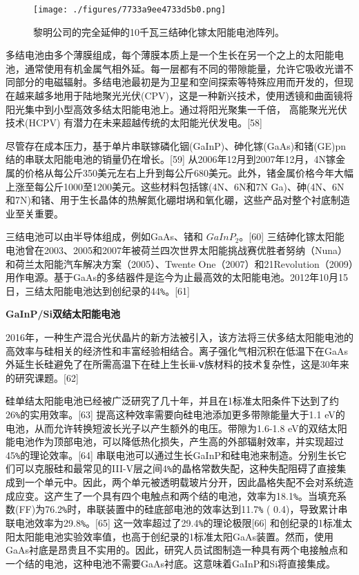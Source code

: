 \begin{figure}[ht]
\centering
\texttt{[image: ./figures/7733a9ee4733d5b0.png]}
\caption{黎明公司的完全延伸的10千瓦三结砷化镓太阳能电池阵列。} \label{fig_TYNDC_6}
\end{figure}

多结电池由多个薄膜组成，每个薄膜本质上是一个生长在另一个之上的太阳能电池，通常使用有机金属气相外延。每一层都有不同的带隙能量，允许它吸收光谱不同部分的电磁辐射。多结电池最初是为卫星和空间探索等特殊应用而开发的，但现在越来越多地用于陆地聚光光伏(CPV)，这是一种新兴技术，使用透镜和曲面镜将阳光集中到小型高效多结太阳能电池上。通过将阳光聚集一千倍， 高能聚光光伏技术(HCPV) 有潜力在未来超越传统的太阳能光伏发电。[58]

尽管存在成本压力，基于单片串联镓磷化铟(GaInP)、砷化镓(GaAs)和锗(GE)pn结的串联太阳能电池的销量仍在增长。[59] 从2006年12月到2007年12月，4N镓金属的价格从每公斤350美元左右上升到每公斤680美元。此外，锗金属价格今年大幅上涨至每公斤1000至1200美元。这些材料包括镓(4N、6N和7N Ga)、砷(4N、6N和7N)和锗、用于生长晶体的热解氮化硼坩埚和氧化硼，这些产品对整个衬底制造业至关重要。

三结电池可以由半导体组成，例如GaAs、锗和 $GaInP_2$。[60] 三结砷化镓太阳能电池曾在2003、2005和2007年被荷兰四次世界太阳能挑战赛优胜者努纳（Nuna）和荷兰太阳能汽车解决方案（2005）、Twente One（2007）和21Revolution（2009）用作电源。基于GaAs的多结器件是迄今为止最高效的太阳能电池。2012年10月15日，三结太阳能电池达到创纪录的44\verb`%`。[61]

\textbf{GaInP/Si双结太阳能电池}

2016年，一种生产混合光伏晶片的新方法被引入，该方法将三伏多结太阳能电池的高效率与硅相关的经济性和丰富经验相结合。离子强化气相沉积在低温下在GaAs外延生长硅避免了在所需高温下在硅上生长ⅲ-ⅴ族材料的技术复杂性，这是30年来的研究课题。[62]

硅单结太阳能电池已经被广泛研究了几十年，并且在1标准太阳条件下达到了约26\verb`%`的实用效率。[63] 提高这种效率需要向硅电池添加更多带隙能量大于1.1 eV的电池，从而允许转换短波长光子以产生额外的电压。带隙为1.6-1.8 eV的双结太阳能电池作为顶部电池，可以降低热化损失，产生高的外部辐射效率，并实现超过45\verb`%`的理论效率。[64] 串联电池可以通过生长GaInP和硅电池来制造。分别生长它们可以克服硅和最常见的III-V层之间4\verb`%`的晶格常数失配，这种失配阻碍了直接集成到一个单元中。因此，两个单元被透明载玻片分开，因此晶格失配不会对系统造成应变。这产生了一个具有四个电触点和两个结的电池，效率为18.1\verb`%`。当填充系数(FF)为76.2\verb`%`时，串联装置中的硅底部电池的效率达到11.7\verb`%` ( 0.4)，导致累计串联电池效率为29.8\verb`%`。[65] 这一效率超过了29.4\verb`%`的理论极限[66] 和创纪录的1标准太阳太阳能电池实验效率值，也高于创纪录的1标准太阳GaAs装置。然而，使用GaAs衬底是昂贵且不实用的。因此，研究人员试图制造一种具有两个电接触点和一个结的电池，这种电池不需要GaAs衬底。这意味着GaInP和Si将直接集成。

